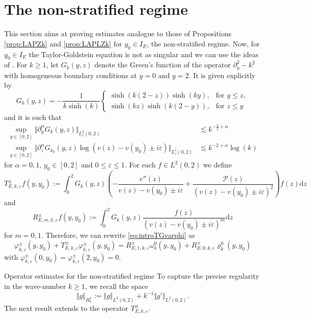 \documentclass[11pt,reqno]{amsproc}
\makeatletter
\renewcommand\subsection{\@startsection{subsection}{2}%
\normalparindent{.5\linespacing\@plus.7\linespacing}{-.5em}
{\normalfont\bfseries}}
\theoremstyle{definition}
\numberwithin{equation}{section}
\renewcommand{\d}{\mathrm{d}}
\newcommand{\ep}{\varepsilon}
\renewcommand{\P}{{\mathcal{P}}}
\makeatother
\begin{document}
\section{The non-stratified regime}\label{sec:nonstrat}
This section aims at proving estimates analogue to those of Propositions \ref{prop:LAPZk} and \ref{prop:LAPLZk} for $y_0\in I_E$, the non-stratified regime. Now, for $y_0\in I_E$ the Taylor-Goldstein equation is not as singular and we can use the ideas of \cites{Jia20, JiaGev20}. For $k\geq 1$, let $G_k(y,z)$ denote the Green's function of the operator $\partial_y^2 - k^2$ with homogeneous boundary conditions at $y=0$ and $y=2$. It is given explicitly by
\begin{equation}\label{eq:defGk}
G_k(y,z) = -\frac{1}{k\sinh(k)}\begin{cases}
\sinh(k(2-z))\sinh(ky), & \text{for }y\leq z, \\
\sinh(kz)\sinh(k(2-y)), & \text{for }z\leq y
\end{cases}
\end{equation}
and it is such that
\begin{align}
\sup_{y\in[0,2]}\Vert \partial_y^\alpha G_k(y,z) \Vert_{L^2_z(0,2)} &\lesssim k^{-\frac32+\alpha} \label{eq:L2boundGk} \\
\sup_{y\in[0,2]} \Vert \partial_z^\alpha G_{k_0}(y,z) \log(v(z) - v(y_0) \pm i\ep) \Vert_{L^1_z(0,2)}&\lesssim k^{-2+\alpha}\log(k)\label{eq:L1boundGklog}
\end{align}
for $\alpha=0,1$, $y_0\in[0,2]$ and $0\leq \ep\leq 1$. For each $f \in L^2(0,2)$ we define
\begin{equation}\label{eq:defTE}
T_{E,k,\ep}^\pm f(y,y_0) := \int_0^2 G_k(y,z) \left( -\frac{v''(z)}{v(z) - v(y_0) \pm i\ep} + \frac{\P(z)}{(v(z) - v(y_0) \pm i\ep)^2} \right) f(z) \d z
\end{equation}
and
\begin{equation}\label{eq:defREm}
R_{E,m,k,\ep}^\pm f(y,y_0) := \int_0^2 G_k(y,z) \frac{f(z)}{(v(z) - v(y_0) \pm i\ep)^m} \d z
\end{equation}
for $m=0,1$. Therefore, we can rewrite \eqref{eq:introTGvarphi} as
\begin{equation}\label{eq:LAPTGvarphi}
\varphi_{k,\ep}^\pm(y,y_0) + T_{E,k,\ep}^\pm\varphi_{k,\ep}^\pm(y,y_0) = R_{E,1,k,\ep}^\pm\omega_k^0(y,y_0) + R_{E,0,k,\ep}^\pm \varrho_k^0(y,y_0)
\end{equation}
with $\varphi_{k,\ep}^\pm(0,y_0) = \varphi_{k,\ep}^\pm(2,y_0)=0$. 

\subsection{Operator estimates for the non-stratified regime}
To capture the precise regularity in the wave-number $k\geq 1$, we recall the space
\begin{equation*}
\Vert g \Vert_{H_k^1}:=\Vert g \Vert_{L^2(0,2)} + k^{-1}\Vert g' \Vert_{L^2(0,2)}.
\end{equation*}
The next result extends \cite[Lemma 3.1]{JiaGev20} to the operator $T_{E,k,\ep}^\pm$.
\end{document}
